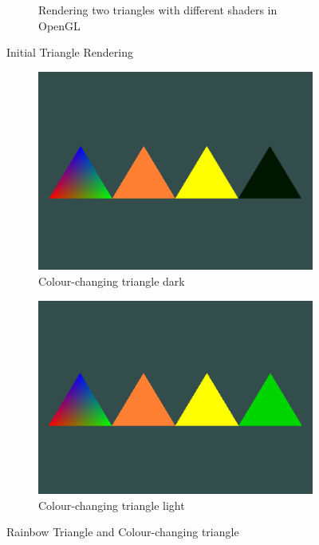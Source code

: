 \documentclass[12pt]{article}
\begin{document}
\begin{figure}[H]
\begin{subfigure}[b]{0.45\textwidth}
            \caption{Rendering two triangles with different shaders in OpenGL}
        \end{subfigure}
        \caption{Initial Triangle Rendering}
    \end{figure}

    \begin{figure}[H]
        \centering
        \begin{subfigure}[b]{0.45\textwidth}
            \centering
            \includegraphics[width=\textwidth]{openGL4TrianglesDark.png}
            \caption{Colour-changing triangle dark}
        \end{subfigure}
        \hfill
        \begin{subfigure}[b]{0.45\textwidth}
            \centering
            \includegraphics[width=\textwidth]{openGL4TrianglesLight.png}
            \caption{Colour-changing triangle light}
        \end{subfigure}
        \caption{Rainbow Triangle and Colour-changing triangle}
    \end{figure}
\end{document}
